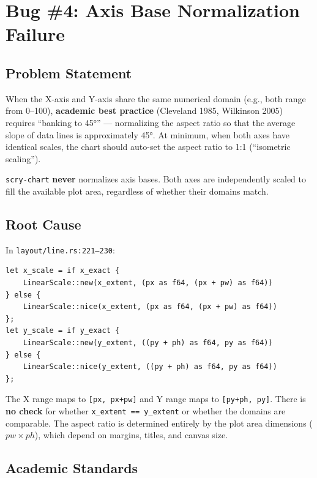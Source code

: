 \documentclass[11pt,a4paper]{article}
\begin{document}
\section{Bug \#4: Axis Base Normalization Failure}
\label{sec:normalization}

\subsection{Problem Statement}
When the X-axis and Y-axis share the same numerical domain (e.g., both range
from 0--100), \textbf{academic best practice} (Cleveland 1985, Wilkinson 2005)
requires ``banking to 45°'' — normalizing the aspect ratio so that the average
slope of data lines is approximately 45°. At minimum, when both axes have
identical scales, the chart should auto-set the aspect ratio to 1:1
(``isometric scaling'').

\texttt{scry-chart} \textbf{never} normalizes axis bases. Both axes are
independently scaled to fill the available plot area, regardless of whether
their domains match.

\subsection{Root Cause}

In \texttt{layout/line.rs:221--230}:

\begin{lstlisting}[firstnumber=221]
let x_scale = if x_exact {
    LinearScale::new(x_extent, (px as f64, (px + pw) as f64))
} else {
    LinearScale::nice(x_extent, (px as f64, (px + pw) as f64))
};
let y_scale = if y_exact {
    LinearScale::new(y_extent, ((py + ph) as f64, py as f64))
} else {
    LinearScale::nice(y_extent, ((py + ph) as f64, py as f64))
};
\end{lstlisting}

The X range maps to \texttt{[px, px+pw]} and Y range maps to \texttt{[py+ph, py]}.
There is \textbf{no check} for whether \texttt{x\_extent == y\_extent} or
whether the domains are comparable. The aspect ratio is determined entirely
by the plot area dimensions ($pw \times ph$), which depend on margins, titles,
and canvas size.

\subsection{Academic Standards}
\end{document}
